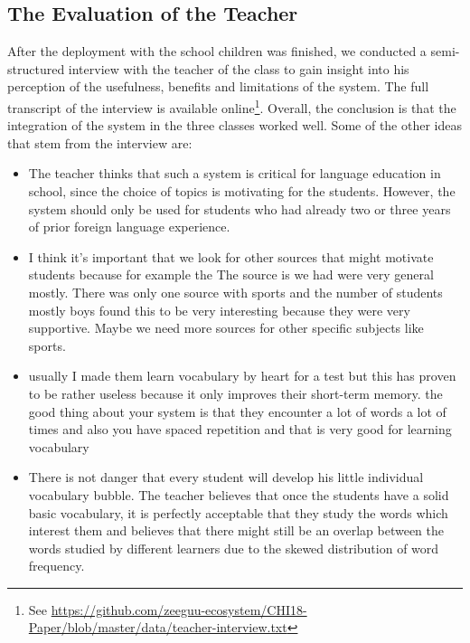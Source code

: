 
\subsection{The Evaluation of the Teacher}
After the deployment with the school children was finished, we conducted a semi-structured interview with the teacher of the class to gain insight into his perception of the usefulness, benefits and limitations of the system. The full transcript of the interview is available online\footnote{See \url{https://github.com/zeeguu-ecosystem/CHI18-Paper/blob/master/data/teacher-interview.txt}}. Overall, the conclusion is that the integration of the system in the three classes worked well. Some of the other ideas that stem from the interview are: 

\begin{itemize}

	\item The teacher thinks that such a system is critical for language education in school, since the choice of topics is motivating for the students. However, the system should only be used for students who had already two or three years of prior foreign language experience. 

	\item I think it's important that we look for other sources that might motivate students because for example the The source is we had were very general mostly. There was only one source with sports and the number of students mostly boys found this to be very interesting because they were very supportive. Maybe we need more sources for other specific subjects like sports.

	\item usually I made them learn vocabulary by heart for a test but this has proven to be rather useless because it only improves their short-term memory.  the good thing about your system is that they encounter a lot of words a lot of times and also you have spaced repetition and that is very good for learning vocabulary

	\item There is not danger that every student will develop his little individual vocabulary bubble. The teacher believes that once the students have a solid basic vocabulary, it is perfectly acceptable that they study the words which interest them and believes that there might still be an overlap between the words studied by different learners due to the skewed distribution of word frequency. 


\end{itemize}
